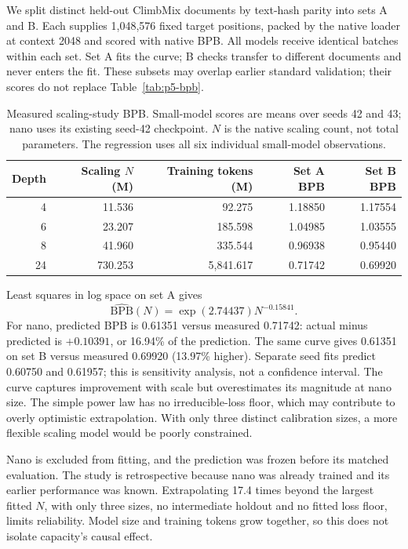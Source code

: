 \documentclass[11pt]{article}
\begin{document}
We split distinct held-out ClimbMix documents by text-hash parity into sets A
and B. Each supplies 1,048,576 fixed target positions, packed by the native
loader at context 2048 and scored with native BPB. All models receive identical
batches within each set. Set A fits the curve; B checks transfer to different
documents and never enters the fit. These subsets may overlap earlier standard
validation; their scores do not replace Table~\ref{tab:p5-bpb}.

\begin{table}[htbp]
\centering\small
\begin{tabular}{rrrrr}
\hline
Depth & Scaling $N$ (M) & Training tokens (M) & Set A BPB & Set B BPB \\
\hline
4 & 11.536 & 92.275 & 1.18850 & 1.17554 \\
6 & 23.207 & 185.598 & 1.04985 & 1.03555 \\
8 & 41.960 & 335.544 & 0.96938 & 0.95440 \\
24 & 730.253 & 5,841.617 & 0.71742 & 0.69920 \\
\hline
\end{tabular}
\caption{Measured scaling-study BPB. Small-model scores are means over seeds
42 and 43; nano uses its existing seed-42 checkpoint. $N$ is the native
scaling count, not total parameters. The regression uses all six individual
small-model observations.}
\label{tab:p5-scaling}
\end{table}

Least squares in log space on set A gives
\[
\widehat{\mathrm{BPB}}(N)=\exp(2.74437)N^{-0.15841}.
\]
For nano, predicted BPB is 0.61351 versus measured 0.71742: actual minus
predicted is $+0.10391$, or 16.94\% of the prediction. The same curve gives
0.61351 on set B versus measured 0.69920 (13.97\% higher). Separate seed fits
predict 0.60750 and 0.61957; this is sensitivity analysis, not a confidence
interval. The curve captures improvement with scale but overestimates its
magnitude at nano size. The simple power law has no irreducible-loss floor,
which may contribute to overly optimistic extrapolation.
With only three distinct calibration sizes, a more
flexible scaling model would be poorly constrained.


Nano is excluded from fitting, and the prediction was frozen before its
matched evaluation. The study is retrospective because nano was already
trained and its earlier performance was known. Extrapolating 17.4 times beyond
the largest fitted $N$, with only three sizes, no intermediate holdout and no
fitted loss floor, limits reliability. Model size and training tokens grow
together, so this does not isolate capacity's causal effect.
\end{document}
